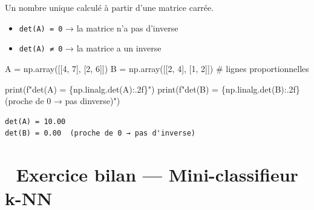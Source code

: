 \documentclass[
  french,
  11pt,
  a4paper,
]{scrbook}
\newenvironment{Shaded}{}{}
\newcommand{\BuiltInTok}[1]{\textcolor[rgb]{0.84,0.23,0.29}{#1}}
\newcommand{\CommentTok}[1]{\textcolor[rgb]{0.42,0.45,0.49}{#1}}
\newcommand{\DecValTok}[1]{\textcolor[rgb]{0.00,0.36,0.77}{#1}}
\newcommand{\NormalTok}[1]{\textcolor[rgb]{0.14,0.16,0.18}{#1}}
\newcommand{\OperatorTok}[1]{\textcolor[rgb]{0.14,0.16,0.18}{#1}}
\newcommand{\SpecialCharTok}[1]{\textcolor[rgb]{0.00,0.36,0.77}{#1}}
\newcommand{\SpecialStringTok}[1]{\textcolor[rgb]{0.01,0.18,0.38}{#1}}
\providecommand{\tightlist}{%
  \setlength{\itemsep}{0pt}\setlength{\parskip}{0pt}}
\begin{document}
Un nombre unique calculé à partir d'une matrice carrée.

\begin{itemize}
\tightlist
\item
  \texttt{det(A)\ =\ 0} → la matrice n'a pas d'inverse
\item
  \texttt{det(A)\ ≠\ 0} → la matrice a un inverse
\end{itemize}

\begin{Shaded}
\begin{Highlighting}[]
\NormalTok{A }\OperatorTok{=}\NormalTok{ np.array([[}\DecValTok{4}\NormalTok{, }\DecValTok{7}\NormalTok{], [}\DecValTok{2}\NormalTok{, }\DecValTok{6}\NormalTok{]])}
\NormalTok{B }\OperatorTok{=}\NormalTok{ np.array([[}\DecValTok{2}\NormalTok{, }\DecValTok{4}\NormalTok{], [}\DecValTok{1}\NormalTok{, }\DecValTok{2}\NormalTok{]])  }\CommentTok{\# lignes proportionnelles}

\BuiltInTok{print}\NormalTok{(}\SpecialStringTok{f"det(A) = }\SpecialCharTok{\{}\NormalTok{np}\SpecialCharTok{.}\NormalTok{linalg}\SpecialCharTok{.}\NormalTok{det(A)}\SpecialCharTok{:.2f\}}\SpecialStringTok{"}\NormalTok{)}
\BuiltInTok{print}\NormalTok{(}\SpecialStringTok{f"det(B) = }\SpecialCharTok{\{}\NormalTok{np}\SpecialCharTok{.}\NormalTok{linalg}\SpecialCharTok{.}\NormalTok{det(B)}\SpecialCharTok{:.2f\}}\SpecialStringTok{  (proche de 0 → pas d\textquotesingle{}inverse)"}\NormalTok{)}
\end{Highlighting}
\end{Shaded}

\begin{verbatim}
det(A) = 10.00
det(B) = 0.00  (proche de 0 → pas d'inverse)
\end{verbatim}

\chapter{🏁 Exercice bilan --- Mini-classifieur
k-NN}\label{exercice-bilan-mini-classifieur-k-nn}
\end{document}
